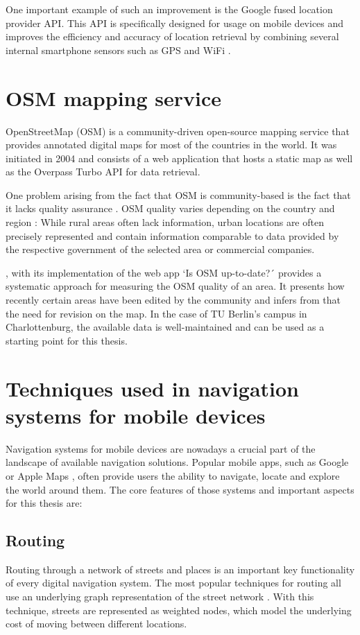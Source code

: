 One important example of such an improvement is the Google fused location provider API. This API is specifically designed for usage on mobile devices and improves the efficiency and accuracy of location retrieval by combining several internal smartphone sensors such as GPS and WiFi \cite{fused_location_api}.

\section{OSM mapping service}
OpenStreetMap (OSM) is a community-driven open-source mapping service that provides annotated digital maps for most of the countries in the world. It was initiated in 2004 and consists of a web application \cite{openstreetmap_website} that hosts a static map as well as the Overpass Turbo API \cite{openstreetmap_overpass_turbo} for data retrieval.

One problem arising from the fact that OSM is community-based is the fact that it lacks quality assurance \cite{quality_of_openstreetmap}. OSM quality varies depending on the country and region \cite{quality_of_openstreetmap}: While rural areas often lack information, urban locations are often precisely represented and contain information comparable to data provided by the respective government of the selected area or commercial companies.

\cite{quality_of_openstreetmap}, with its implementation of the web app `Is OSM up-to-date?´ provides a systematic approach for measuring the OSM quality of an area. It presents how recently certain areas have been edited by the community and infers from that the need for revision on the map. In the case of TU Berlin's campus in Charlottenburg, the available data is well-maintained \cite{is_osm_up_to_date} and can be used as a starting point for this thesis.

\section{Techniques used in navigation systems for mobile devices}
Navigation systems for mobile devices are nowadays a crucial part of the landscape of available navigation solutions. Popular mobile apps, such as Google \cite{google_maps_website} or Apple Maps \cite{apple_maps_website}, often provide users the ability to navigate, locate and explore the world around them. The core features of those systems and important aspects for this thesis are:

\subsection{Routing}
Routing through a network of streets and places is an important key functionality of every digital navigation system. The most popular techniques for routing all use an underlying graph representation of the street network \cite{google_maps}. With this technique, streets are represented as weighted nodes, which model the underlying cost of moving between different locations.

